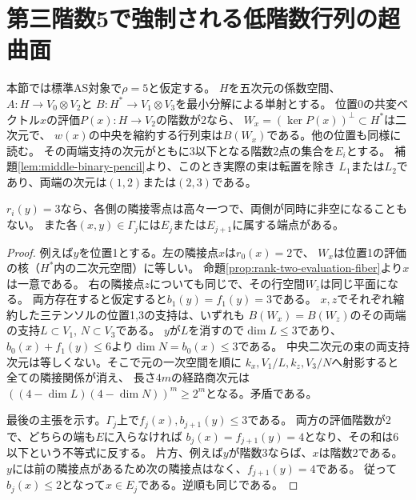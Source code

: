 \section{第三階数5で強制される低階数行列の超曲面}
\label{sec:rank-five-pencils}
本節では標準AS対象で$\rho=5$と仮定する。
$H$を五次元の係数空間、$A:H\to V_0\otimes V_2$と
$B:H^*\to V_1\otimes V_3$を最小分解による単射とする。
位置0の共変ベクトル$x$の評価$P(x):H\to V_2$の階数が2なら、
$W_x=(\ker P(x))^\perp\subset H^*$は二次元で、
$w(x)$の中央を縮約する行列束は$B(W_x)$である。他の位置も同様に読む。
その両端支持の次元がともに3以下となる階数2点の集合を$E_i$とする。
補題\ref{lem:middle-binary-pencil}より、このとき実際の束は転置を除き
$L_1$または$L_2$であり、両端の次元は$(1,2)$または$(2,3)$である。

\begin{lemma}\label{lem:rho-five-rank-three-neighbors}
$r_i(y)=3$なら、各側の隣接零点は高々一つで、両側が同時に非空になることもない。
また各$(x,y)\in\Gamma_j$には$E_j$または$E_{j+1}$に属する端点がある。
\end{lemma}
\begin{proof}
例えば$y$を位置1とする。左の隣接点$x$は$r_0(x)=2$で、
$W_x$は位置1の評価の核（$H^*$内の二次元空間）に等しい。
命題\ref{prop:rank-two-evaluation-fiber}より$x$は一意である。
右の隣接点$z$についても同じで、その行空間$W_z$は同じ平面になる。
両方存在すると仮定すると$b_1(y)=f_1(y)=3$である。
$x,z$でそれぞれ縮約した三テンソルの位置1,3の支持は、いずれも
$B(W_x)=B(W_z)$のその両端の支持$L\subset V_1$, $N\subset V_3$である。
$y$が$L$を消すので$\dim L\le3$であり、
$b_0(x)+f_1(y)\le6$より$\dim N=b_0(x)\le3$である。
中央二次元の束の両支持次元は等しくない。そこで元の一次空間を順に
$k_x,V_1/L,k_z,V_3/N$へ射影すると全ての隣接関係が消え、
長さ$4m$の経路商次元は$((4-\dim L)(4-\dim N))^m\ge2^m$となる。矛盾である。

最後の主張を示す。$\Gamma_j$上で$f_j(x),b_{j+1}(y)\le3$である。
両方の評価階数が2で、どちらの端も$E$に入らなければ
$b_j(x)=f_{j+1}(y)=4$となり、その和は6以下という不等式に反する。
片方、例えば$y$が階数3ならば、$x$は階数2である。
$y$には前の隣接点があるため次の隣接点はなく、$f_{j+1}(y)=4$である。
従って$b_j(x)\le2$となって$x\in E_j$である。逆順も同じである。
\end{proof}

